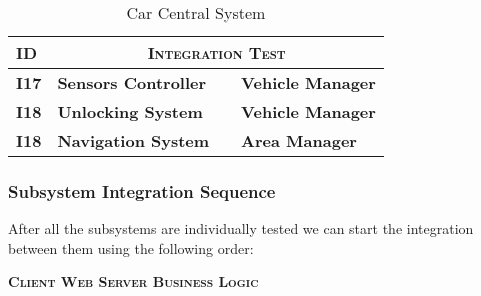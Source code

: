 \begin{longtable}{ |l|p{4.5cm}cp{4.7cm}| }
  \caption{Car Central System} \\
	\hline
  \textbf{ID} & \multicolumn{3}{c|}{\textsc{\textbf{Integration Test}}} \\
  \hline
  \textbf{I17} & \textbf{Sensors Controller} & \textbf{\textrightarrow{}} & \textbf{Vehicle Manager} \\
  \hline
  \textbf{I18} & \textbf{Unlocking System} & \textbf{\textrightarrow{}} & \textbf{Vehicle Manager} \\
  \hline
  \textbf{I18} & \textbf{Navigation System} & \textbf{\textrightarrow{}} & \textbf{Area Manager} \\
  \hline
\end{longtable}

\subsubsection{Subsystem Integration Sequence}

After all the subsystems are individually tested we can start the integration
between them using the following order: \newline

\centerline{\textsc{\textbf{Client \textrightarrow{} Web Server \textrightarrow{} Business Logic}}}
